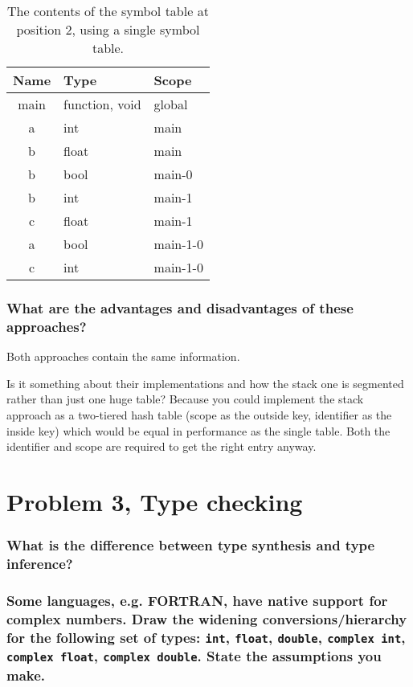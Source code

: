 \begin{table}[H]
\begin{tabular}{|c|l|l|}
	\hline
	Name	& Type			& Scope \\ \hline
	main	& function, void& global \\
	a		& int			& main	\\
	b		& float			& main	\\
	b		& bool			& main-0 \\
	b		& int			& main-1 \\
	c		& float			& main-1 \\
	a		& bool			& main-1-0 \\
	c		& int			& main-1-0 \\
	\hline
\end{tabular}
\label{tab:2-b-2}
\caption{The contents of the symbol table at position 2, using a single symbol table.}
\end{table}

\subsubsection{What are the advantages and disadvantages of these approaches?}
Both approaches contain the same information.

Is it something about their implementations and how the stack one is segmented rather than just one huge table?
Because you could implement the stack approach as a two-tiered hash table (scope as the outside key, identifier as the inside key) which would be equal in performance as the single table.
Both the identifier and scope are required to get the right entry anyway.

\newpage
\setcounter{subsubsection}{0}
\section{Problem 3, Type checking}
\subsubsection{What is the difference between type synthesis and type inference?}

\subsubsection{Some languages, e.g. FORTRAN, have native support for complex numbers. Draw the widening conversions/hierarchy for the following set of types: \texttt{int}, \texttt{float}, \texttt{double}, \texttt{complex int}, \texttt{complex float}, \texttt{complex double}. State the assumptions you make.}


